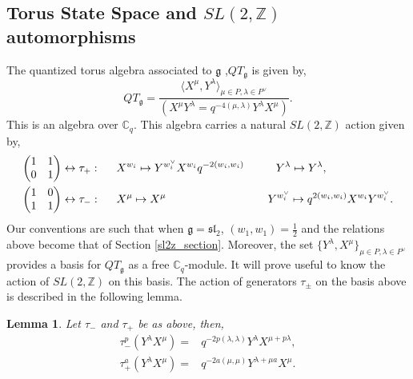 \documentclass{article}
\newtheorem{lemma}[theorem]{Lemma}
\numberwithin{corollary}{theorem}
\numberwithin{corollary}{proposition}
\begin{document}
 

\subsection{Torus State Space and \texorpdfstring{$SL(2,\mathbb{Z})$}{SL(2,Z)} automorphisms}

The quantized torus algebra associated to $\mathfrak{g}$ ,$QT_\mathfrak{g}$ is given by,
$$QT_\mathfrak{g} = \frac{\langle X^\mu ,Y^\lambda\rangle_{\mu\in P,\lambda\in P^\vee}}{(X^\mu Y^\lambda = q^{-4(\mu,\lambda)} Y^\lambda X^\mu)}.$$
This is an algebra over $\mathbb{C}_q$. This algebra carries a natural $SL(2,\mathbb{Z})$ action given by, 
\begin{align}
 \begin{pmatrix}
1 & 1 \\
0 & 1 
\end{pmatrix} &\leftrightarrow \tau_{+}: \hspace{0.5cm} X^{w_i} \mapsto  Y^{w_i^\vee} X^{w_i} q^{-2(w_i,w_i)} \hspace{1cm}  Y^\lambda \mapsto Y^\lambda, \\
\begin{pmatrix}
1 & 0 \\
1 & 1 
\end{pmatrix} &\leftrightarrow \tau_{-}: \hspace{0.5cm}  X^\mu \mapsto X^\mu \hspace{3.2cm}   Y^{w_i^\vee}  \mapsto q^{2(w_i,w_i)} X^{w_i}  Y^{w_i^\vee}.
\end{align}
Our conventions are such that when $\mathfrak{g} = \mathfrak{sl}_2$, $(w_1,w_1) = \frac{1}{2}$ and the relations above become that of Section \ref{sl2z_section}. Moreover, the set $\{Y^\lambda, X^\mu\}_{\mu\in P,\lambda\in P^\vee}$ provides a basis for $QT_\mathfrak{g}$ as a free $\mathbb{C}_q$-module. It will prove useful to know the action of $SL(2,\mathbb{Z})$ on this basis. The action of generators $\tau_{\pm}$ on the basis above is described in the following lemma. 
\begin{lemma}\label{tau_mat_lemma} Let $\tau_-$ and $\tau_+$ be as above, then,
\begin{align*}
   \tau_-^{p}(Y^\lambda X^\mu ) = & q^{-2p(\lambda,\lambda)} Y^\lambda X^{\mu+p\lambda}, \\
   \tau_+^{a}(Y^\lambda X^\mu ) = & q^{-2a(\mu,\mu)} Y^{\lambda +\mu a}X^{\mu}.
\end{align*}
\end{lemma}
\end{document}
